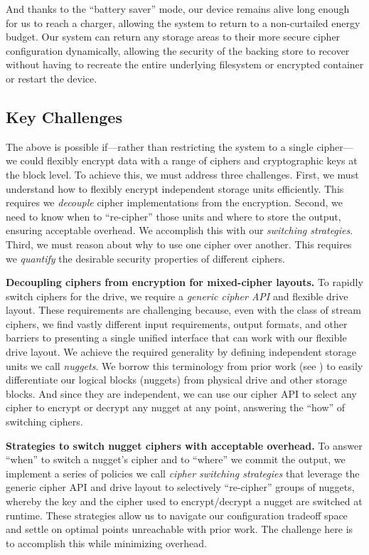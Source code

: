 And thanks to the ``battery saver'' mode, our device remains alive long enough
for us to reach a charger, allowing the system to return to a non-curtailed
energy budget. Our system can return any storage areas to their more secure
cipher configuration dynamically, allowing the security of the backing store to
recover without having to recreate the entire underlying filesystem or encrypted
container or restart the device.

\subsection{Key Challenges}

The above is possible if---rather than restricting the system to a single
cipher---we could flexibly encrypt data with a range of ciphers and
cryptographic keys at the block level. To achieve this, we must address three
challenges. First, we must understand how to flexibly encrypt independent
storage units efficiently. This requires we \emph{decouple} cipher
implementations from the encryption. Second, we need to know when to
``re-cipher'' those units and where to store the output, ensuring acceptable
overhead. We accomplish this with our \emph{switching strategies}. Third, we
must reason about why to use one cipher over another. This requires we
\emph{quantify} the desirable security properties of different ciphers.

\textbf{Decoupling ciphers from encryption for mixed-cipher layouts.} To rapidly
switch ciphers for the drive, we require a \emph{generic cipher API} and
flexible drive layout. These requirements are challenging because, even with the
class of stream ciphers, we find vastly different input requirements, output
formats, and other barriers to presenting a single unified interface that can
work with our flexible drive layout. We achieve the required generality by
defining independent storage units we call \emph{nuggets}. We borrow this
terminology from prior work (see \cite{StrongBox}) to easily differentiate our
logical blocks (nuggets) from physical drive and other storage blocks. And since
they are independent, we can use our cipher API to select any cipher to encrypt
or decrypt any nugget at any point, answering the ``how'' of switching ciphers.

\textbf{Strategies to switch nugget ciphers with acceptable overhead.} To answer
``when'' to switch a nugget's cipher and to ``where'' we commit the output, we
implement a series of policies we call \textit{cipher switching strategies} that
leverage the generic cipher API and drive layout to selectively ``re-cipher''
groups of nuggets, whereby the key and the cipher used to encrypt/decrypt a
nugget are switched at runtime. These strategies allow us to navigate our
configuration tradeoff space and settle on optimal points unreachable with prior
work. The challenge here is to accomplish this while minimizing overhead.

